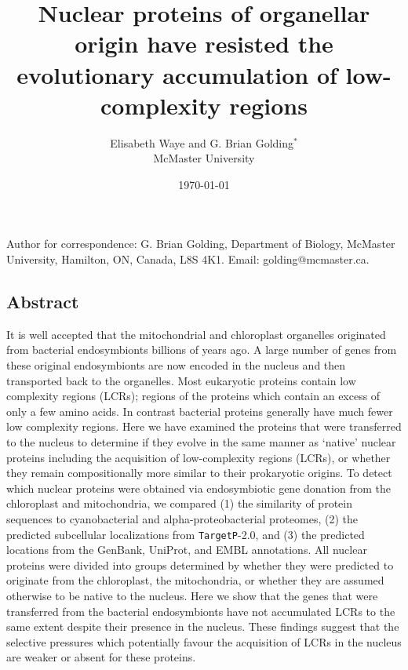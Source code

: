 \documentclass[a4paper,12pt]{article}
\newcommand{\tget}{\mbox{\texttt{TargetP}}\xspace}
\begin{document}
\title{ Nuclear proteins of organellar origin 
have resisted the evolutionary accumulation of low-complexity
regions}
\author{\sc Elisabeth Waye and G. Brian Golding$^*$\\ \footnotesize McMaster University}
\date{\footnotesize \today}
\maketitle
\begin{center}\vspace*{-5mm}\parbox[c]{14cm}{
    \raggedright\footnotesize\noindent * Author for correspondence:
    G. Brian Golding, Department of Biology, McMaster University,
    Hamilton, ON, Canada, L8S 4K1. Email: golding@mcmaster.ca.
}\end{center}
\thispagestyle{empty}

\begin{center}\vspace*{-5mm}\parbox[c]{15cm}{
\section*{Abstract}\small
It is well accepted that the mitochondrial and chloroplast organelles
originated from bacterial endosymbionts billions of years ago. A large
number of genes from these original endosymbionts are now encoded in the
nucleus and then transported back to the organelles.  Most eukaryotic
proteins contain low complexity regions (LCRs); regions of the proteins
which contain an excess of only a few amino acids.  In contrast bacterial
proteins generally have much fewer low complexity regions.  Here we have
examined the proteins that were transferred to the nucleus to determine
if they evolve in the same manner as `native' nuclear proteins including
the acquisition of low-complexity regions (LCRs), or whether they remain
compositionally more similar to their prokaryotic origins.  To detect
which nuclear proteins were obtained via endosymbiotic gene donation
from the chloroplast and mitochondria, we compared (1) the similarity of
protein sequences to cyanobacterial and alpha-proteobacterial proteomes,
(2) the predicted subcellular localizations from \tget-2.0, and (3)
the predicted locations from the GenBank, UniProt, and EMBL annotations.
All nuclear proteins were divided into groups determined by whether they
were predicted to originate from the chloroplast, the mitochondria, or
whether they are assumed otherwise to be native to the nucleus.  Here we
show that the genes that were transferred from the bacterial endosymbionts
have not accumulated LCRs to the same extent despite their presence in
the nucleus.  These findings suggest that the selective pressures which
potentially favour the acquisition of LCRs in the nucleus are weaker or
absent for these proteins.\\[4mm] }\end{center}
\end{document}
